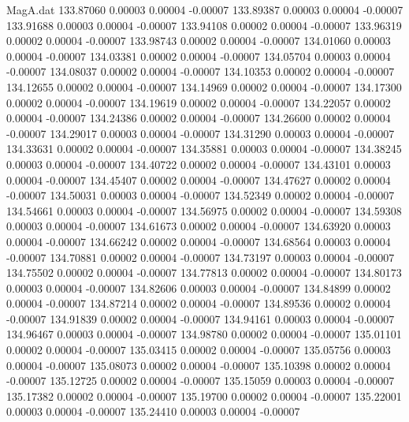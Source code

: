 \begin{filecontents}{MagA.dat}
 133.87060    0.00003    0.00004   -0.00007
 133.89387    0.00003    0.00004   -0.00007
 133.91688    0.00003    0.00004   -0.00007
 133.94108    0.00002    0.00004   -0.00007
 133.96319    0.00002    0.00004   -0.00007
 133.98743    0.00002    0.00004   -0.00007
 134.01060    0.00003    0.00004   -0.00007
 134.03381    0.00002    0.00004   -0.00007
 134.05704    0.00003    0.00004   -0.00007
 134.08037    0.00002    0.00004   -0.00007
 134.10353    0.00002    0.00004   -0.00007
 134.12655    0.00002    0.00004   -0.00007
 134.14969    0.00002    0.00004   -0.00007
 134.17300    0.00002    0.00004   -0.00007
 134.19619    0.00002    0.00004   -0.00007
 134.22057    0.00002    0.00004   -0.00007
 134.24386    0.00002    0.00004   -0.00007
 134.26600    0.00002    0.00004   -0.00007
 134.29017    0.00003    0.00004   -0.00007
 134.31290    0.00003    0.00004   -0.00007
 134.33631    0.00002    0.00004   -0.00007
 134.35881    0.00003    0.00004   -0.00007
 134.38245    0.00003    0.00004   -0.00007
 134.40722    0.00002    0.00004   -0.00007
 134.43101    0.00003    0.00004   -0.00007
 134.45407    0.00002    0.00004   -0.00007
 134.47627    0.00002    0.00004   -0.00007
 134.50031    0.00003    0.00004   -0.00007
 134.52349    0.00002    0.00004   -0.00007
 134.54661    0.00003    0.00004   -0.00007
 134.56975    0.00002    0.00004   -0.00007
 134.59308    0.00003    0.00004   -0.00007
 134.61673    0.00002    0.00004   -0.00007
 134.63920    0.00003    0.00004   -0.00007
 134.66242    0.00002    0.00004   -0.00007
 134.68564    0.00003    0.00004   -0.00007
 134.70881    0.00002    0.00004   -0.00007
 134.73197    0.00003    0.00004   -0.00007
 134.75502    0.00002    0.00004   -0.00007
 134.77813    0.00002    0.00004   -0.00007
 134.80173    0.00003    0.00004   -0.00007
 134.82606    0.00003    0.00004   -0.00007
 134.84899    0.00002    0.00004   -0.00007
 134.87214    0.00002    0.00004   -0.00007
 134.89536    0.00002    0.00004   -0.00007
 134.91839    0.00002    0.00004   -0.00007
 134.94161    0.00003    0.00004   -0.00007
 134.96467    0.00003    0.00004   -0.00007
 134.98780    0.00002    0.00004   -0.00007
 135.01101    0.00002    0.00004   -0.00007
 135.03415    0.00002    0.00004   -0.00007
 135.05756    0.00003    0.00004   -0.00007
 135.08073    0.00002    0.00004   -0.00007
 135.10398    0.00002    0.00004   -0.00007
 135.12725    0.00002    0.00004   -0.00007
 135.15059    0.00003    0.00004   -0.00007
 135.17382    0.00002    0.00004   -0.00007
 135.19700    0.00002    0.00004   -0.00007
 135.22001    0.00003    0.00004   -0.00007
 135.24410    0.00003    0.00004   -0.00007

\end{filecontents}
